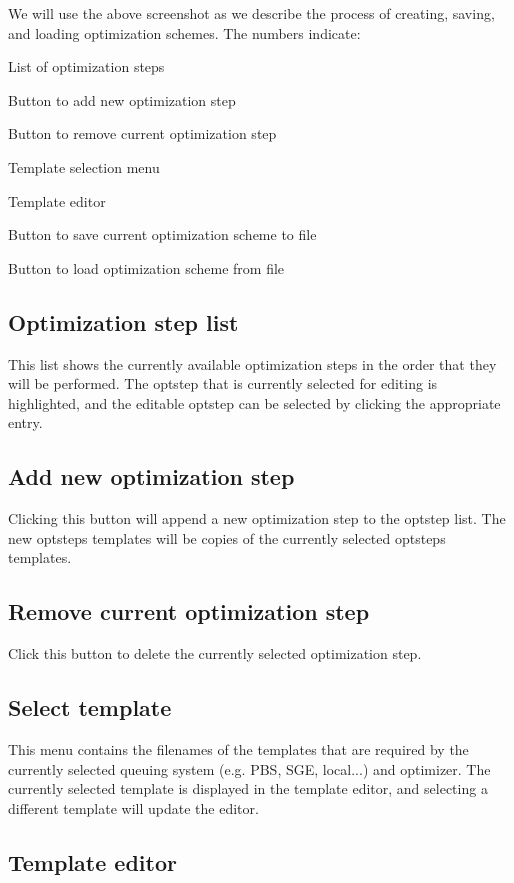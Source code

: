 We will use the above screenshot as we describe the process of creating, saving, and loading optimization schemes. The numbers indicate\+:


\begin{DoxyEnumerate}
\item List of optimization steps
\item Button to add new optimization step
\item Button to remove current optimization step
\item Template selection menu
\item Template editor
\item Button to save current optimization scheme to file
\item Button to load optimization scheme from file
\end{DoxyEnumerate}\hypertarget{optschemes_gui-list}{}\subsection{Optimization step list}\label{optschemes_gui-list}
This list shows the currently available optimization steps in the order that they will be performed. The optstep that is currently selected for editing is highlighted, and the editable optstep can be selected by clicking the appropriate entry.\hypertarget{optschemes_gui-add}{}\subsection{Add new optimization step}\label{optschemes_gui-add}
Clicking this button will append a new optimization step to the optstep list. The new optstep\textquotesingle{}s templates will be copies of the currently selected optstep\textquotesingle{}s templates.\hypertarget{optschemes_gui-rem}{}\subsection{Remove current optimization step}\label{optschemes_gui-rem}
Click this button to delete the currently selected optimization step.\hypertarget{optschemes_gui-tselect}{}\subsection{Select template}\label{optschemes_gui-tselect}
This menu contains the filenames of the templates that are required by the currently selected queuing system (e.\+g. P\+B\+S, S\+G\+E, local...) and optimizer. The currently selected template is displayed in the template editor, and selecting a different template will update the editor.\hypertarget{optschemes_gui-editor}{}\subsection{Template editor}\label{optschemes_gui-editor}
